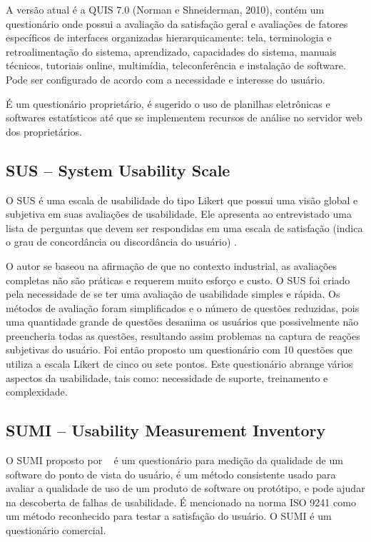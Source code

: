 	A versão atual é a QUIS 7.0 (Norman e Shneiderman, 2010), contém um questionário onde possui a avaliação da satisfação geral e avaliações de fatores específicos de interfaces organizadas hierarquicamente: tela, terminologia e retroalimentação do sistema, aprendizado, capacidades do sistema, manuais técnicos, tutoriais online, multimídia, teleconferência e instalação de software. Pode ser configurado de acordo com a necessidade e interesse do usuário. 

	É um questionário proprietário, é sugerido o uso de planilhas eletrônicas e softwares estatísticos até que se implementem recursos de análise no servidor web dos proprietários.

\subsection{SUS – System Usability Scale}

	O SUS é uma escala de usabilidade do tipo Likert que possui uma visão global e subjetiva em suas avaliações de usabilidade. Ele apresenta ao entrevistado uma lista de perguntas que devem ser respondidas em uma escala de satisfação (indica o grau de concordância ou discordância do usuário) \cite{brooke1996sus}.

	O autor se baseou na afirmação de que no contexto industrial, as avaliações completas não são práticas e requerem muito esforço e custo. O SUS foi criado pela necessidade de se ter uma avaliação de usabilidade simples e rápida. Os métodos de avaliação foram simplificados e o número de questões reduzidas, pois uma quantidade grande de questões desanima os usuários que possivelmente não preencheria todas as questões, resultando assim problemas na captura de reações subjetivas do usuário. Foi então proposto um questionário com 10 questões que utiliza a escala Likert de cinco ou sete pontos. Este questionário abrange vários aspectos da usabilidade, tais como: necessidade de suporte, treinamento e complexidade. ~\cite{preece2007}

\subsection{SUMI – Usability Measurement Inventory}

	O SUMI proposto por ~ é um questionário para medição da qualidade de um software do ponto de vista do usuário, é um método consistente usado para avaliar a qualidade de uso de um produto de software ou protótipo, e pode ajudar na descoberta de falhas de usabilidade. É mencionado na norma ISO 9241 como um método reconhecido para testar a satisfação do usuário. O SUMI é um questionário comercial. 

